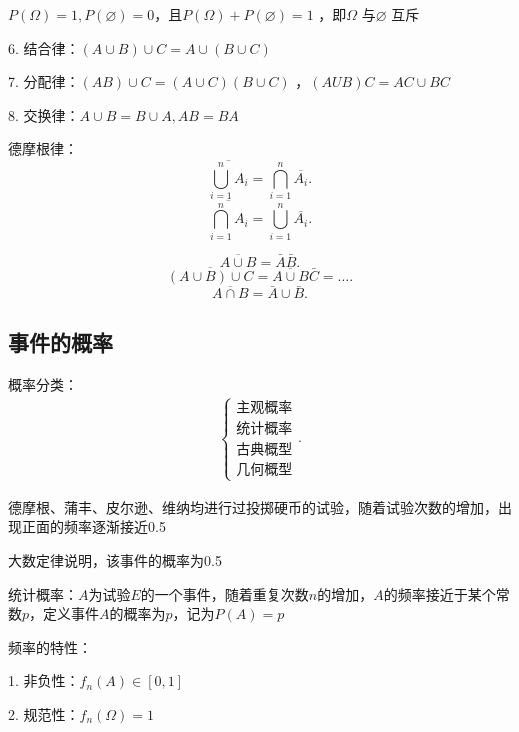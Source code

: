 \begin{notation}
    $P\left( \Omega \right) =1,P\left( \varnothing \right) =0$，且$P\left( \Omega \right) +P\left( \varnothing \right) =1$ ，即$\Omega$ 与$\varnothing$ 互斥
\end{notation}

6. 结合律：$\left( A\cup B \right) \cup C = A\cup \left( B\cup C \right) $

7. 分配律：$\left( AB \right) \cup C=\left( A\cup C \right) \left( B\cup C \right) $ ，$\left( AUB \right) C =AC\cup BC$

8. 交换律：$A\cup B=B\cup A,AB=BA$
\begin{notation}
    德摩根律：\[
    \overline{\bigcup_{i=1}^{n}A_i} = \bigcap_{i=1}^{n}\overline{A_i}
    .\] 
    \[
        \overline{\bigcap_{i=1}^{n}A_i}=\bigcup_{i=1}^{n}\overline{A_i}
    .\] 
\end{notation}
\begin{eg}
     \[
        \overline{A\cup B}=\bar{A}\bar{B}
    .\]
    \[
        \overline{\left( A\cup B \right) \cup C} = \overline{A\cup B}\bar{C}=\ldots
    .\] 
    \[
        \overline{A\cap B}=\bar{A}\cup \bar{B}
    .\] 
\end{eg}
\subsection{事件的概率}%
\label{sub:事件的概率}
概率分类：
\begin{align*}
    \begin{cases}
        \mbox{主观概率}\\ 
        \mbox{统计概率}\\
        \mbox{古典概型}\\
        \mbox{几何概型}
    \end{cases}
.\end{align*}
\begin{notation}
    德摩根、蒲丰、皮尔逊、维纳均进行过投掷硬币的试验，随着试验次数的增加，出现正面的频率逐渐接近0.5

    大数定律说明，该事件的概率为0.5
\end{notation}
\begin{defi}
    统计概率：$A$为试验$E$的一个事件，随着重复次数$n$的增加，$A$的频率接近于某个常数$p$，定义事件$A$的概率为$p$，记为$P\left( A \right) =p$
\end{defi}
频率的特性：

1. 非负性：$f_n\left( A \right) \in \left[ 0,1 \right] $

2. 规范性：$f_n\left( \Omega \right) =1$

